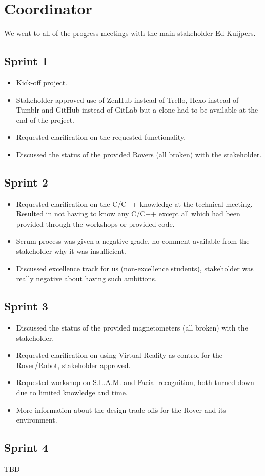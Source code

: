 \section{Coordinator}
We went to all of the progress meetings with the main stakeholder Ed Kuijpers.

\subsection{Sprint 1}
\begin{itemize}
	\item Kick-off project.
	\item Stakeholder approved use of ZenHub instead of Trello, Hexo instead of Tumblr and GitHub instead of GitLab but a clone had to be available at the end of the project.
	\item Requested clarification on the requested functionality.
	\item Discussed the status of the provided Rovers (all broken) with the stakeholder.
\end{itemize}

\subsection{Sprint 2}
\begin{itemize}
	\item Requested clarification on the C/C++ knowledge at the technical meeting. Resulted in not having to know any C/C++ except all which had been provided through the workshops or provided code.
	\item Scrum process was given a negative grade, no comment available from the stakeholder why it was insufficient.
	\item Discussed excellence track for us (non-excellence students), stakeholder was really negative about having such ambitions.
\end{itemize}

\subsection{Sprint 3}
\begin{itemize}
	\item Discussed the status of the provided magnetometers (all broken) with the stakeholder.
	\item Requested clarification on using Virtual Reality as control for the Rover/Robot, stakeholder approved.
	\item Requested workshop on S.L.A.M. and Facial recognition, both turned down due to limited knowledge and time.
	\item More information about the design trade-offs for the Rover and its environment.
\end{itemize}

\subsection{Sprint 4}
TBD
